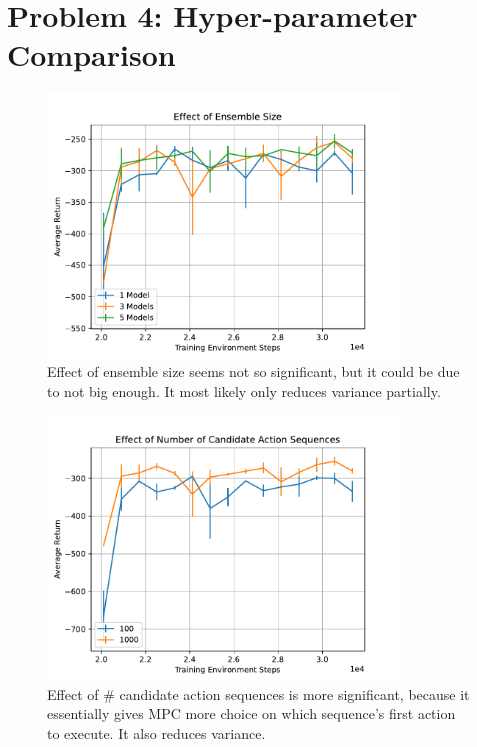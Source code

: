 \documentclass{article}
\begin{document}
\section{Problem 4: Hyper-parameter Comparison}
\begin{answer}[title=Plot,height=9.5cm,width=\linewidth]
    \begin{figure}[H]
        \centering
        \includegraphics[height=7cm]{figs/P4_ensemble_size.pdf}
        \caption{Effect of ensemble size seems not so significant, but it could be due to not big enough.
            It most likely only reduces variance partially.}
    \end{figure}
\end{answer}

\begin{answer}[title=Plot,height=9.5cm,width=\linewidth]
    \begin{figure}[H]
        \centering
        \includegraphics[height=7cm]{figs/P4_number_of_candidate_action_sequences.pdf}
        \caption{Effect of \# candidate action sequences is more significant, because it essentially gives MPC more choice on which sequence's first action to execute.
            It also reduces variance.}
    \end{figure}
\end{answer}
\end{document}
